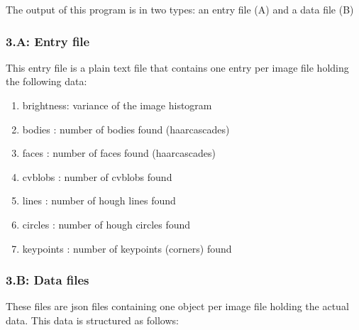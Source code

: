 The output of this program is in two types: an entry file (A) and a data file (B)

\subsubsection*{3.A: Entry file} 
This entry file is a plain text file that contains one entry per image file holding the following data:

\begin{enumerate}
\singlespacing
\item brightness: variance of the image histogram
\item bodies : number of bodies found (haarcascades)
\item faces : number of faces found (haarcascades)
\item cvblobs : number of cvblobs found
\item lines : number of hough lines found
\item circles : number of hough circles found
\item keypoints : number of keypoints (corners) found
\end{enumerate}

\subsubsection*{3.B: Data files}

These files are \gls{json} files containing one object per image file holding the actual data. This data is structured as follows:


